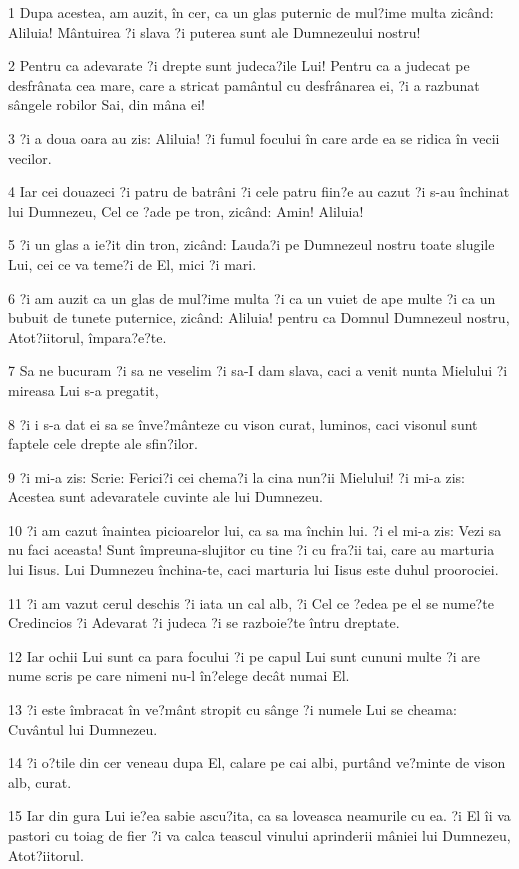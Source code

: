 \par 1 Dupa acestea, am auzit, în cer, ca un glas puternic de mul?ime multa zicând: Aliluia! Mântuirea ?i slava ?i puterea sunt ale Dumnezeului nostru!
\par 2 Pentru ca adevarate ?i drepte sunt judeca?ile Lui! Pentru ca a judecat pe desfrânata cea mare, care a stricat pamântul cu desfrânarea ei, ?i a razbunat sângele robilor Sai, din mâna ei!
\par 3 ?i a doua oara au zis: Aliluia! ?i fumul focului în care arde ea se ridica în vecii vecilor.
\par 4 Iar cei douazeci ?i patru de batrâni ?i cele patru fiin?e au cazut ?i s-au închinat lui Dumnezeu, Cel ce ?ade pe tron, zicând: Amin! Aliluia!
\par 5 ?i un glas a ie?it din tron, zicând: Lauda?i pe Dumnezeul nostru toate slugile Lui, cei ce va teme?i de El, mici ?i mari.
\par 6 ?i am auzit ca un glas de mul?ime multa ?i ca un vuiet de ape multe ?i ca un bubuit de tunete puternice, zicând: Aliluia! pentru ca Domnul Dumnezeul nostru, Atot?iitorul, împara?e?te.
\par 7 Sa ne bucuram ?i sa ne veselim ?i sa-I dam slava, caci a venit nunta Mielului ?i mireasa Lui s-a pregatit,
\par 8 ?i i s-a dat ei sa se înve?mânteze cu vison curat, luminos, caci visonul sunt faptele cele drepte ale sfin?ilor.
\par 9 ?i mi-a zis: Scrie: Ferici?i cei chema?i la cina nun?ii Mielului! ?i mi-a zis: Acestea sunt adevaratele cuvinte ale lui Dumnezeu.
\par 10 ?i am cazut înaintea picioarelor lui, ca sa ma închin lui. ?i el mi-a zis: Vezi sa nu faci aceasta! Sunt împreuna-slujitor cu tine ?i cu fra?ii tai, care au marturia lui Iisus. Lui Dumnezeu închina-te, caci marturia lui Iisus este duhul proorociei.
\par 11 ?i am vazut cerul deschis ?i iata un cal alb, ?i Cel ce ?edea pe el se nume?te Credincios ?i Adevarat ?i judeca ?i se razboie?te întru dreptate.
\par 12 Iar ochii Lui sunt ca para focului ?i pe capul Lui sunt cununi multe ?i are nume scris pe care nimeni nu-l în?elege decât numai El.
\par 13 ?i este îmbracat în ve?mânt stropit cu sânge ?i numele Lui se cheama: Cuvântul lui Dumnezeu.
\par 14 ?i o?tile din cer veneau dupa El, calare pe cai albi, purtând ve?minte de vison alb, curat.
\par 15 Iar din gura Lui ie?ea sabie ascu?ita, ca sa loveasca neamurile cu ea. ?i El îi va pastori cu toiag de fier ?i va calca teascul vinului aprinderii mâniei lui Dumnezeu, Atot?iitorul.
